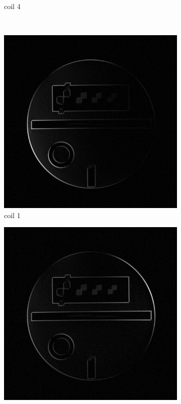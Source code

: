 \documentclass[UTF8]{article}
\begin{document}
\begin{figure}[ht]
\begin{subfigure}[h]{0.2\textwidth}
		\caption{coil 4 }
		\label{fig:2e}
	\end{subfigure}\\
	\begin{subfigure}[h]{0.2\textwidth}
		\centering
		\includegraphics[scale=0.15]{./image/1cc.jpg}
		\caption{coil 1 }
		\label{fig:3b}
	\end{subfigure}
	\begin{subfigure}[h]{0.2\textwidth}
		\centering
		\includegraphics[scale=0.15]{./image/2cc.jpg}

\end{subfigure}
\end{figure}
\end{document}
